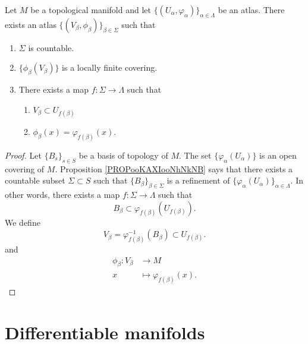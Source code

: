 \begin{proposition}		\label{PROPooYJKOooRwbOXF}
	Let \( M\) be a topological manifold and let \( \{ (U_{\alpha},\varphi_{\alpha}) \}_{\alpha\in \Lambda}\) be an atlas. There exists an atlas \( \{ (V_{\beta}, \phi_{\beta}) \}_{\beta\in\Sigma}\) such that
	\begin{enumerate}
		\item
		      \( \Sigma\) is countable.
		\item
		      \( \{ \phi_{\beta}(V_{\beta}) \}\) is a locally finite covering.
		\item
		      There exists a map \(f \colon \Sigma\to \Lambda  \) such that
		      \begin{enumerate}
			      \item
			            \( V_{\beta}\subset U_{f(\beta)}\)
			      \item
			            \( \phi_{\beta}(x)=\varphi_{f(\beta)}(x)\).
		      \end{enumerate}
	\end{enumerate}
\end{proposition}

\begin{proof}
	Let \( \{ B_s \}_{s\in S}\) be a basis of topology of \( M\). The set \( \{ \varphi_{\alpha}(U_{\alpha}) \}\) is an open covering of \( M\). Proposition \ref{PROPooKAXIooNhNkNB} says that there exists a countable subset \( \Sigma\subset S\) such that \( \{ B_{\beta} \}_{\beta\in \Sigma}\) is a refinement of \( \{ \varphi_{\alpha}(U_{\alpha}) \}_{\alpha\in \Lambda}\). In other words, there exists a map \(f \colon \Sigma\to \Lambda  \) such that
	\begin{equation}
		B_{\beta}\subset \varphi_{f(\beta)}(U_{f(\beta)}).
	\end{equation}
	We define
	\begin{equation}
		V_{\beta}=\varphi_{f(\beta)}^{-1}(B_{\beta})\subset U_{f(\beta)}.
	\end{equation}
	and
	\begin{equation}
		\begin{aligned}
			\phi_{\beta}\colon V_{\beta} & \to M                          \\
			x                            & \mapsto \varphi_{f(\beta)}(x).
		\end{aligned}
	\end{equation}
\end{proof}

\section{Differentiable manifolds}

